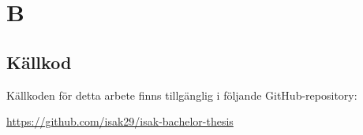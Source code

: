 \section{ B}\label{sec:appB}
\subsection{Källkod}

Källkoden för detta arbete finns tillgänglig i följande GitHub-repository:

\begin{center}
\url{https://github.com/isak29/isak-bachelor-thesis}
\end{center}
